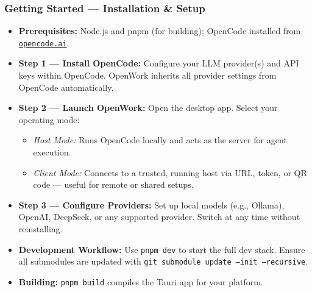\begin{frame}[fragile]\frametitle{Getting Started — Installation \& Setup}
  \begin{itemize}
    \item \textbf{Prerequisites:} Node.js and pnpm (for building); OpenCode installed from \href{https://opencode.ai}{\texttt{opencode.ai}}.
    \item \textbf{Step 1 — Install OpenCode:} Configure your LLM provider(s) and API keys within OpenCode. OpenWork inherits all provider settings from OpenCode automatically.
    \item \textbf{Step 2 — Launch OpenWork:} Open the desktop app. Select your operating mode:
      \begin{itemize}
        \item \textit{Host Mode:} Runs OpenCode locally and acts as the server for agent execution.
        \item \textit{Client Mode:} Connects to a trusted, running host via URL, token, or QR code — useful for remote or shared setups.
      \end{itemize}
    \item \textbf{Step 3 — Configure Providers:} Set up local models (e.g., Ollama), OpenAI, DeepSeek, or any supported provider. Switch at any time without reinstalling.
    \item \textbf{Development Workflow:} Use \texttt{pnpm dev} to start the full dev stack. Ensure all submodules are updated with \texttt{git submodule update --init --recursive}.
    \item \textbf{Building:} \texttt{pnpm build} compiles the Tauri app for your platform.
  \end{itemize}
\end{frame}

